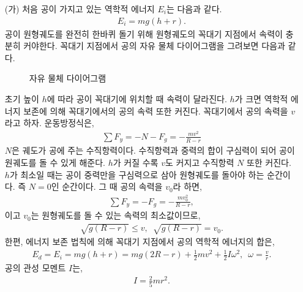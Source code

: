 \documentclass[floatfix,nofootinbib,superscriptaddress,fleqn]{revtex4-2}
\begin{document}
\begin{itemize}
  \item[(가)] 처음 공이 가지고 있는 역학적 에너지 $E_i$는 다음과 같다.
  \begin{align}
    E_i = mg(h+r).
  \end{align}
  공이 원형궤도를 완전히 한바퀴 돌기 위해 원형궤도의 꼭대기 지점에서 속력이 충분히
  커야한다. 꼭대기 지점에서 공의 자유 물체 다이어그램을 그려보면 다음과 같다.

  \begin{figure}[htp]
    \centering
    \caption{자유 물체 다이어그램}
    \label{fig:11}
  \end{figure}
  초기 높이 $h$에 따라 공이 꼭대기에 위치할 때 속력이 달라진다. $h$가 크면 역학적 에너지 보존에
  의해 꼭대기에서의 공의 속력 또한 커진다. 꼭대기에서 공의 속력을 
  $v$라고 하자. 운동방정식은,
  \begin{align}
    \sum F_y = -N-F_g = -\frac{mv^2}{R-r}
  \end{align}
  $N$은 궤도가 공에 주는 수직항력이다. 수직항력과 중력의 합이 구심력이 되어 공이 원궤도를 돌 수 있게
  해준다. $h$가 커질 수록 $v$도 커지고 수직항력 $N$ 또한 커진다. $h$가 최소일 때는 공이 
  중력만을 구심력으로 삼아 원형궤도를 돌아야 하는 순간이다. 즉 $N=0$인 순간이다. 
  그 때 공의 속력을 $v_0$라 하면,
  \begin{align}
    \sum F_y = -F_g = -\frac{mv_0^2}{R-r},
  \end{align}
  이고 $v_0$는 원형궤도를 돌 수 있는 속력의 최소값이므로,
  \begin{align}\label{eq:4-1}
    \sqrt{g(R-r)} \leq v,\,\,\,\sqrt{g(R-r)} = v_0.  
  \end{align}
  한편, 에너지 보존 법칙에 의해 꼭대기 지점에서 공의 역학적 에너지의 합은,
  \begin{align}
    E_d = E_i = mg(h+r) = mg(2R-r) + \frac{1}{2}mv^2+\frac{1}{2}
    I\omega^2,\,\,\,\omega = \frac{v}{r}.
  \end{align}
  공의 관성 모멘트 $I$는,
  \begin{align}
    I = \frac{2}{5}mr^2.

\end{align}
\end{itemize}
\end{document}
